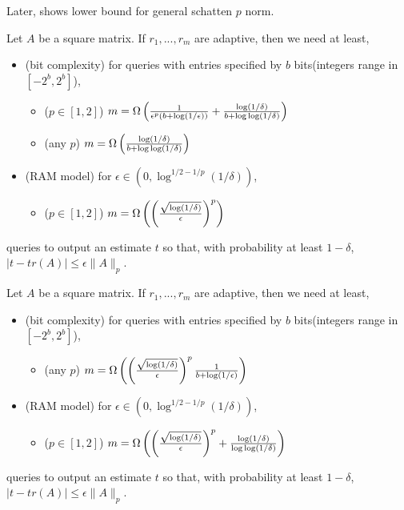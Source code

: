 Later, \cite{woodruff2022optimal} shows lower bound for general schatten $p$ norm.
\begin{thm}
\label{tr_est_ada_schatten_p}
Let $A$ be a square matrix. If $r_1,...,r_m$ are adaptive,
then we need at least, 
\begin{itemize}
    \item (bit complexity) for queries with entries specified by $b$ bits(integers range in $[-2^b,2^b]$),
    \begin{itemize}
        \item ($p\in[1,2]$) $m=\Omega\left(\frac{1}{\epsilon^p(b+\log(1/\epsilon))}+\frac{\log(1/\delta)}{b+\log\log(1/\delta)}\right)$ 
        \item (any $p$) $m=\Omega\left(\frac{\log(1/\delta)}{b+\log\log(1/\delta)}\right)$ 
    \end{itemize}
    \item (RAM model) for $\epsilon\in(0,\log^{1/2-1/p}(1/\delta))$,
    \begin{itemize}
        \item ($p\in[1,2]$) $m=\Omega\left(\left(\frac{\sqrt{\log(1/\delta)}}{\epsilon}\right)^p\right)$ 
    \end{itemize}
\end{itemize}
queries  to output an estimate $t$ so that, with probability at least $1-\delta$, $|t-tr(A)|\le \epsilon \|A\|_p$. 
\end{thm}
\pfsk{\ref{tr_est_ada_schatten_p}}{

}

\begin{thm}
\label{tr_est_nada_schatten_p}
Let $A$ be a square matrix. If $r_1,...,r_m$ are adaptive,
then we need at least, 
\begin{itemize}
    \item (bit complexity) for queries with entries specified by $b$ bits(integers range in $[-2^b,2^b]$),
    \begin{itemize}
        \item (any $p$) $m=\Omega\left(\left(\frac{\sqrt{\log(1/\delta)}}{\epsilon}\right)^p\frac{1}{b+\log(1/\epsilon)}\right)$ 
    \end{itemize}
    \item (RAM model) for $\epsilon\in(0,\log^{1/2-1/p}(1/\delta))$,
    \begin{itemize}
        \item ($p\in[1,2]$) $m=\Omega\left(\left(\frac{\sqrt{\log(1/\delta)}}{\epsilon}\right)^p+\frac{\log(1/\delta)}{\log\log(1/\delta)}\right)$ 
    \end{itemize}
\end{itemize}
queries  to output an estimate $t$ so that, with probability at least $1-\delta$, $|t-tr(A)|\le \epsilon \|A\|_p$. 
\end{thm}
\pfsk{\ref{tr_est_nada_schatten_p}}{
        
}


